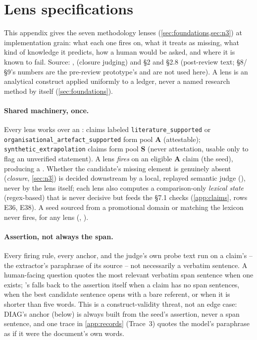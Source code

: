 \section{Lens specifications}
\label{app:lenses}

This appendix gives the seven methodology lenses (\cref{sec:foundations,sec:n3}) at
implementation grain: what each one fires on, what it treats as missing, what kind of knowledge
it predicts, how a human would be asked, and where it is known to fail. Source: ,
 (closure judging) and 
\S2 and \S2.8 (post-review text; \S8/\S9's numbers are the pre-review prototype's and are not used
here). A lens is an analytical construct applied uniformly to a ledger, never a named research
method by itself (\cref{sec:foundations}).

\paragraph{Shared machinery, once.} Every lens works over an \evobs{} : claims labeled
{\small\nolinkurl{literature_supported}} or {\small\nolinkurl{organisational_artefact_supported}} form pool
\textbf{A} (attestable); {\small\nolinkurl{synthetic_extrapolation}} claims form pool \textbf{S} (never attestation,
usable only to flag an unverified statement). A lens \emph{fires} on an eligible \textbf{A} claim
(the seed), producing a . Whether the candidate's missing element is genuinely
absent (\emph{closure}, \cref{sec:n3}) is decided downstream by a local, replayed semantic judge
(), never by the lens itself; each lens also computes a comparison-only
\emph{lexical state} (regex-based) that is never decisive but feeds the \S7.1 checks
(\cref{app:claims}, rows E36, E38). A seed sourced from a promotional domain or matching the
 lexicon never fires, for any lens (, ).

\paragraph{Assertion, not always the span.} Every firing rule, every anchor, and the judge's own
probe text run on a claim's  -- the extractor's paraphrase of its source -- not
necessarily a verbatim sentence. A human-facing question quotes the most relevant verbatim span
sentence when one exists; 's  falls back to the assertion
itself when a claim has no span sentences, when the best candidate sentence opens with a bare
referent, or when it is shorter than five words. This is a construct-validity threat, not an edge
case: DIAG's anchor (below) is always built from the seed's assertion, never a span sentence, and
one trace in \cref{app:records} (Trace~3) quotes the model's paraphrase as if it were the
document's own words.

